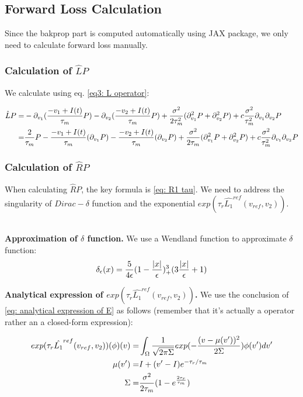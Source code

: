 \documentclass{article}
\begin{document}
	\subsection{Forward Loss Calculation}
	
	Since the bakprop  part is computed automatically using JAX package, we only need to calculate forward loss manually.
	
	\subsubsection{Calculation of $\hat{L}P$}
	
	We calculate using eq. \eqref{eq3: L operator}:
	
	\begin{align}
	\hat{L}P=&-\partial_{v_1}(\frac{-v_1+I(t)}{\tau_m}P)-\partial_{v_2}(\frac{-v_2+I(t)}{\tau_m}P)+\frac{\sigma^2}{2\tau_m^2}(\partial_{v_1}^2P+\partial_{v_2}^2P)+c\frac{\sigma^2}{\tau_m^2}\partial_{v_1}\partial_{v_2}P\notag\\
	=&\frac{2}{\tau_m}P-\frac{-v_1+I(t)}{\tau_m}(\partial_{v_1}P)-\frac{-v_2+I(t)}{\tau_m}(\partial_{v_2}P)+\frac{\sigma^2}{2\tau_m}(\partial_{v_1}^2P+\partial_{v_2}^2P)+c\frac{\sigma^2}{\tau_m^2}\partial_{v_1}\partial_{v_2}P
    \end{align}

	
	\subsubsection{Calculation of $\hat{R}P$}
	
	When calculating $\hat{R}P$, the key formula is \eqref{eq: R1 tau}. We need to address the singularity of $Dirac-\delta$ function and the exponential $exp(\tau_r \hat{L_1}^{ref}(v_{ref},v_2))$.
	
	~\\
	
	\textbf{Approximation of $\delta$ function.} We use a Wendland function to approximate $\delta$ function:
	\begin{equation}
	\delta_\epsilon(x)=\frac{5}{4\epsilon}(1-\frac{\abs{x}}{\epsilon})^3_+(3\frac{\abs{x}}{\epsilon}+1)
	\end{equation}
	

	\textbf{Analytical expression of $exp(\tau_r \hat{L_1}^{ref}(v_{ref},v_2))$.} We use the conclusion of \eqref{eq: analytical expression of E} as follows (remember that it's actually a operator rather an a closed-form expression):

	\begin{align}
		exp(\tau_r \hat{L_1}^{ref}(v_{ref},v_2))(\phi)(v)=&\int_{\Omega}\frac{1}{\sqrt{2\pi\Sigma}}exp(-\frac{(v-\mu(v'))^2}{2\Sigma})\phi(v') dv'\notag\\
	\mu(v')=&I+(v'-I)e^{-\tau_r/\tau_m}\notag\\
	\Sigma=&\frac{\sigma^2}{2\tau_m}(1-e^{\frac{2\tau_r}{\tau_m}})	
	\label{eq: analytical expression of exp L}
	\end{align}
	
\end{document}
